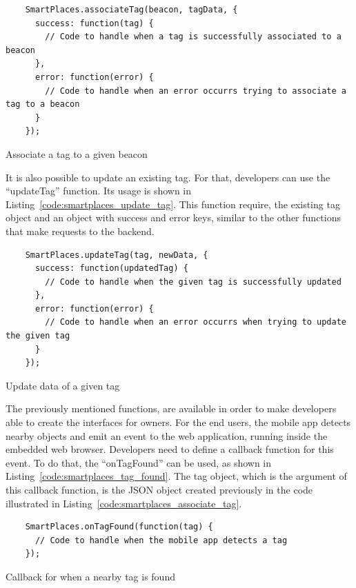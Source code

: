 \begin{listing}[H]
  \begin{verbatim}
    SmartPlaces.associateTag(beacon, tagData, {
      success: function(tag) {
        // Code to handle when a tag is successfully associated to a beacon
      },
      error: function(error) {
        // Code to handle when an error occurrs trying to associate a tag to a beacon
      }
    });
  \end{verbatim}
  \caption[Associate tag]{Associate a tag to a given beacon}
  \label{code:smartplaces_associate_tag}
\end{listing}

It is also possible to update an existing tag. For that, developers can use the ``updateTag'' function. Its usage is shown in Listing~\ref{code:smartplaces_update_tag}. This function require, the existing tag object and an object with success and error keys, similar to the other functions that make requests to the backend.

\begin{listing}[H]
  \begin{verbatim}
    SmartPlaces.updateTag(tag, newData, {
      success: function(updatedTag) {
        // Code to handle when the given tag is successfully updated
      },
      error: function(error) {
        // Code to handle when an error occurrs when trying to update the given tag
      }
    });
  \end{verbatim}
  \caption[Update an existing tag]{Update data of a given tag}
  \label{code:smartplaces_update_tag}
\end{listing}

The previously mentioned functions, are available in order to make developers able to create the interfaces for owners.
For the end users, the mobile app detects nearby objects and emit an event to the web application, running inside the embedded web browser.
Developers need to define a callback function for this event.
To do that, the ``onTagFound'' can be used, as shown in Listing~\ref{code:smartplaces_tag_found}.
The tag object, which is the argument of this callback function, is the \gls{JSON} object created previously in the code illustrated in Listing~\ref{code:smartplaces_associate_tag}.

\begin{listing}[H]
  \begin{verbatim}
    SmartPlaces.onTagFound(function(tag) {
      // Code to handle when the mobile app detects a tag
    });
  \end{verbatim}
  \caption[Tag found]{Callback for when a nearby tag is found}
  \label{code:smartplaces_tag_found}
\end{listing}

